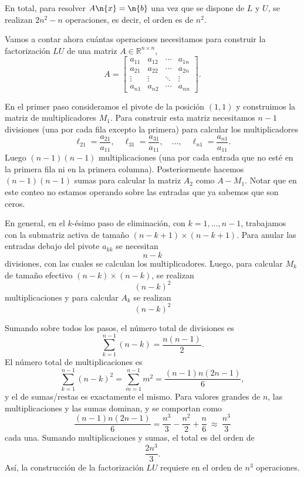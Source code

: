 En total, para resolver $A\n{x}=\n{b}$ una vez que se dispone de $L$ y $U$, se realizan $2n^2 - n $ operaciones, es decir, el orden es de $n^2$. 

Vamos a contar ahora cuántas operaciones necesitamos para construir la factorización $LU$ de una matriz $A \in \mathbb{R}^{n\times n}$,
\[
A = \begin{bmatrix}
a_{11} & a_{12} & \cdots & a_{1n} \\
a_{21} & a_{22} & \cdots & a_{2n} \\
\vdots & \vdots & \ddots & \vdots \\
a_{n1} & a_{n2} & \cdots & a_{nn}
\end{bmatrix}.
\]

En el primer paso consideramos el pivote de la posición $(1,1)$ y construimos la matriz de multiplicadores $M_1$. Para construir esta matriz necesitamos $n-1$ divisiones (una por cada fila excepto la primera) para calcular los multiplicadores
\[
\ell_{21} = \frac{a_{21}}{a_{11}}, \quad \ell_{31} = \frac{a_{31}}{a_{11}}, \quad \dots, \quad \ell_{n1} = \frac{a_{n1}}{a_{11}}.
\]
Luego $(n-1)(n-1)$ multiplicaciones (una por cada entrada que no esté en la primera fila ni en la primera columna). Posteriormente hacemos $(n-1)(n-1)$ sumas para calcular la matriz $A_2$ como $A-M_1$. Notar que en este conteo no estamos operando sobre las entradas que ya sabemos que son ceros.

En general, en el $k$-ésimo paso de eliminación, con $k=1,\dots,n-1$, trabajamos con la submatriz activa de tamaño $(n-k+1)\times(n-k+1)$. Para anular las entradas debajo del pivote $a_{kk}$ se necesitan
\[
n-k
\]
divisiones, con las cuales se calculan los multiplicadores.
Luego, para calcular $M_k$ de tamaño efectivo $(n-k)\times(n-k)$, se realizan
\[
(n-k)^2
\]
multiplicaciones y para calcular $A_{k}$ se realizan
\[
(n-k)^2
\]

Sumando sobre todos los pasos, el número total de divisiones es
\[
\sum_{k=1}^{n-1} (n-k) = \frac{n(n-1)}{2}.
\]
El número total de multiplicaciones es
\[
\sum_{k=1}^{n-1} (n-k)^2 = \sum_{m=1}^{n-1} m^2 = \frac{(n-1)n(2n-1)}{6},
\]
y el de sumas/restas es exactamente el mismo. Para valores grandes de $n$, las multiplicaciones y las sumas dominan, y se comportan como
\[
\frac{(n-1)n(2n-1)}{6} =  \frac{n^3}{3} - \frac{n^2}{2} + \frac{n}{6}\ \approx\ \frac{n^3}{3}
\]
cada una. Sumando multiplicaciones y sumas, el total es del orden de
\[
\frac{2n^3}{3} .
\]
Así, la construcción de la factorización $LU$ requiere en el orden de 
$n^3$
operaciones.

